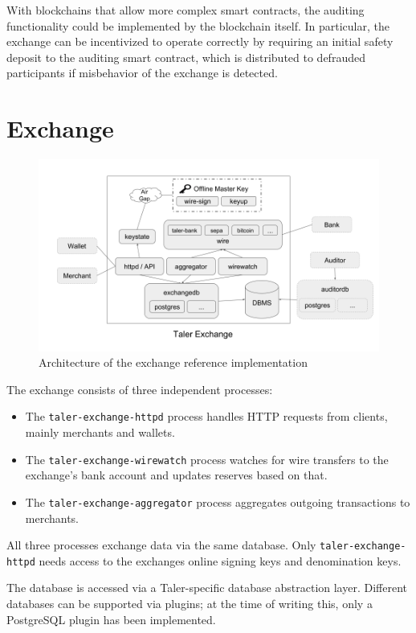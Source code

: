 With blockchains that allow more complex smart contracts, the auditing
functionality could be implemented by the blockchain itself.  In particular,
the exchange can be incentivized to operate correctly by requiring an initial
safety deposit to the auditing smart contract, which is distributed to
defrauded participants if misbehavior of the exchange is detected.

\section{Exchange}

\begin{figure}
    \includegraphics[width=\textwidth]{diagrams/taler-diagram-exchange.png}
    \caption{Architecture of the exchange reference implementation}
\end{figure}

The exchange consists of three independent processes:
\begin{itemize}
  \item The \texttt{taler-exchange-httpd} process handles HTTP requests from clients,
  mainly merchants and wallets.
  \item The \texttt{taler-exchange-wirewatch} process watches for wire transfers
  to the exchange's bank account and updates reserves based on that.
  \item The \texttt{taler-exchange-aggregator} process aggregates outgoing transactions
  to merchants.
\end{itemize}
All three processes exchange data via the same database.  Only
\texttt{taler-exchange-httpd} needs access to the exchanges online signing keys
and denomination keys.

The database is accessed via a Taler-specific database abstraction layer.
Different databases can be supported via plugins; at the time of writing this,
only a PostgreSQL plugin has been implemented.


